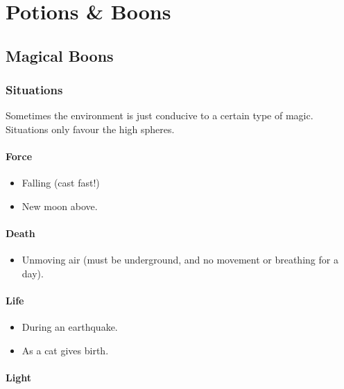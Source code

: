 \chapter[House of Potions \& Boons]{Potions \& Boons}

\section{Magical Boons}

\begin{multicols}{2}

\subsection{Situations}

Sometimes the environment is just conducive to a certain type of magic.
Situations only favour the high spheres.

\subsubsection{Force}

\begin{itemize}
  \item
  Falling (cast fast!)
  \item
  New moon above.
\end{itemize}

\subsubsection{Death}

\begin{itemize}
  \item
  Unmoving air (must be underground, and no movement or breathing for a day).
\end{itemize}

\subsubsection{Life}

\begin{itemize}
  \item
  During an earthquake.
  \item
  As a cat gives birth.
\end{itemize}

\subsubsection{Light}


\end{multicols}
